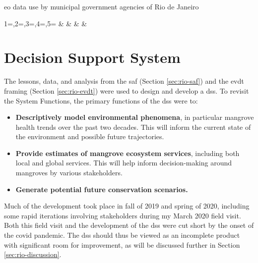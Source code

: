 \begin{table}[H]\centering
	\caption[EO data use by Rio de Janeiro]{\ac{eo} data use by municipal government agencies of Rio de Janeiro}\label{tab:history}
	\fontsize{8}{10}\selectfont
		{1=\year,2=\type,3=\platform,4=\agency,5=\primary}
		{\year & \type & \platform & \agency & \primary}
\end{table}


\section{Decision Support System} \label{sec:rio-dss}

The lessons, data, and analysis from the \ac{saf} (Section \ref{sec:rio-saf}) and the \ac{evdt} framing (Section \ref{sec:rio-evdt}) were used to design and develop a \acf{dss}. To revisit the System Functions, the primary functions of the \ac{dss} were to:

\begin{itemize}[itemsep=0pt,parsep=0pt]
    \item{\textbf{Descriptively model environmental phenomena}, in particular mangrove health trends over the past two decades. This will inform the current state of the environment and possible future trajectories.}
    \item{\textbf{Provide estimates of mangrove ecosystem services}, including both local and global services. This will help inform decision-making around mangroves by various stakeholders.}
    \item{\textbf{Generate potential future conservation scenarios.}}
\end{itemize}

Much of the development took place in fall of 2019 and spring of 2020, including some rapid iterations involving stakeholders during my March 2020 field visit. Both this field visit and the development of the \ac{dss} were cut short by the onset of the \ac{covid} pandemic. The \ac{dss} should thus be viewed as an incomplete product with significant room for improvement, as will be discussed further in Section \ref{sec:rio-discussion}.

